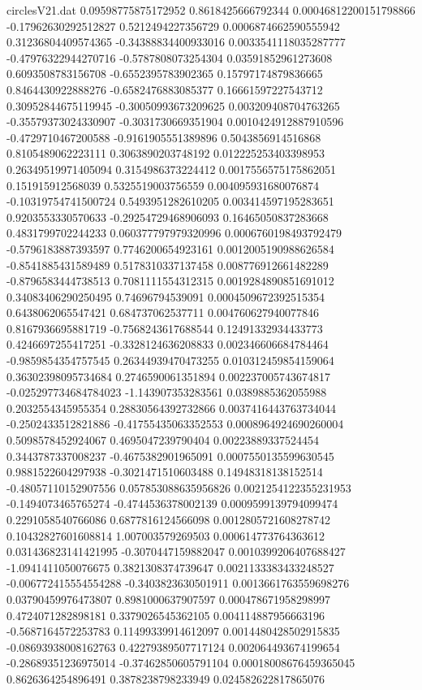 \begin{filecontents}{circlesV21.dat}
0.09598775875172952	0.8618425666792344	0.00046812200151798866
-0.17962630292512827	0.5212494227356729	0.0006874662590555942
0.31236804409574365	-0.34388834400933016	0.0033541118035287777
-0.47976322944270716	-0.5787808073254304	0.03591852961273608
0.6093508783156708	-0.6552395783902365	0.15797174879836665
0.8464430922888276	-0.6582476883085377	0.16661597227543712
0.30952844675119945	-0.30050993673209625	0.003209408704763265
-0.35579373024330907	-0.3031730669351904	0.0010424912887910596
-0.4729710467200588	-0.9161905551389896	0.5043856914516868
0.8105489062223111	0.3063890203748192	0.012225253403398953
0.26349519971405094	0.3154986373224412	0.0017556575175862051
0.151915912568039	0.5325519003756559	0.004095931680076874
-0.10319754741500724	0.5493951282610205	0.003414597195283651
0.9203553330570633	-0.29254729468906093	0.16465050837283668
0.4831799702244233	0.060377797979320996	0.0006760198493792479
-0.5796183887393597	0.7746200654923161	0.0012005190988626584
-0.8541885431589489	0.5178310337137458	0.008776912661482289
-0.8796583444738513	0.7081111554312315	0.0019284890851691012
0.34083406290250495	0.74696794539091	0.0004509672392515354
0.6438062065547421	0.684737062537711	0.004760627940077846
0.8167936695881719	-0.7568243617688544	0.12491332934433773
0.4246697255417251	-0.3328124636208833	0.002346606684784464
-0.9859854354757545	0.26344939470473255	0.010312459854159064
0.36302398095734684	0.2746590061351894	0.002237005743674817
-0.025297734684784023	-1.143907353283561	0.0389885362055988
0.2032554345955354	0.28830564392732866	0.0037416443763734044
-0.2502433512821886	-0.41755435063352553	0.0008964924690260004
0.5098578452924067	0.4695047239790404	0.00223889337524454
0.3443787337008237	-0.4675382901965091	0.0007550135599630545
0.9881522604297938	-0.3021471510603488	0.14948318138152514
-0.48057110152907556	0.057853088635956826	0.0021254122355231953
-0.1494073465765274	-0.4744536378002139	0.0009599139794099474
0.2291058540766086	0.6877816124566098	0.0012805721608278742
0.10432827601608814	1.007003579269503	0.000614773764363612
0.031436823141421995	-0.3070447159882047	0.0010399206407688427
-1.0941411050076675	0.3821308374739647	0.0021133383433248527
-0.006772415554554288	-0.3403823630501911	0.0013661763559698276
0.03790459976473807	0.8981000637907597	0.000478671958298997
0.4724071282898181	0.3379026545362105	0.004114887956663196
-0.5687164572253783	0.11499339914612097	0.0014480428502915835
-0.08693938008162763	0.42279389507717124	0.002064493674199654
-0.28689351236975014	-0.37462850605791104	0.00018008676459365045
0.8626364254896491	0.3878238798233949	0.024582622817865076

\end{filecontents}
